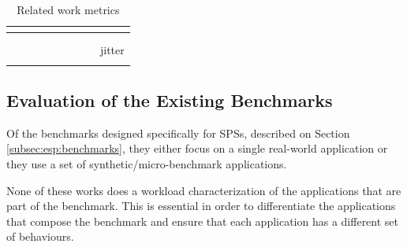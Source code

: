 \documentclass[ppgc,diss,english]{iiufrgs}
\begin{document}
\begin{table}[t]
\begin{center}
\begin{tabular}{ | l | c | c | c | >{\centering\arraybackslash}p{0.5cm} | c | >{\centering\arraybackslash}p{0.7cm} | >{\centering\arraybackslash}p{0.7cm} | >{\centering\arraybackslash}p{1.5cm} |}
		\cite{yahoo2015bench} &  & \textbullet & \textbullet & & & & & \\\hline
		\cite{wang2014bigdatabench} &  &  & \textbullet & & & & & \\\hline
		\cite{wang2016stream} &  & \textbullet & \textbullet & & & & & \\\hline
		\cite{shukla2017riotbench} &  & \textbullet & \textbullet & & & \textbullet & & jitter\\\hline
		\cite{huang2010hibench} &  &  & \textbullet & & \textbullet & \textbullet & & \\\hline
		
	\end{tabular}
	\vspace{5px}
	\caption{Related work metrics}
	\label{table:related_work_metrics}
\end{center}
\end{table}

\subsection{Evaluation of the Existing Benchmarks}
\label{subsec:esp:evaluation_existing_benchmarks}

Of the benchmarks designed specifically for SPSs, described on Section \ref{subsec:esp:benchmarks}, they either focus on a single real-world application or they use a set of synthetic/micro-benchmark applications.

None of these works does a workload characterization of the applications that are part of the benchmark. This is essential in order to differentiate the applications that compose the benchmark and ensure that each application has a different set of behaviours.
\end{document}
